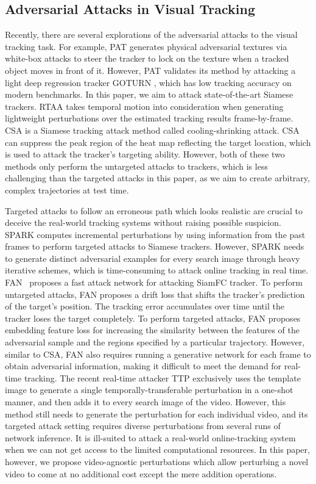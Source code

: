 \documentclass[journal]{IEEEtran}
\renewcommand{\uline}{}
\begin{document}
\subsection{Adversarial Attacks in Visual Tracking} \label{attacktracker}
Recently, there are several explorations of the adversarial attacks to the visual tracking task. For example, PAT \cite{PAT} generates physical adversarial textures via white-box attacks to steer the tracker to lock on the texture when a tracked object moves in front of it. However, PAT validates its method by attacking a light deep regression tracker GOTURN \cite{GOTURN}, which has low tracking accuracy on modern benchmarks. In this paper, we aim to attack state-of-the-art Siamese trackers. RTAA \cite{RTAA} takes temporal motion into consideration when generating lightweight perturbations over the estimated tracking results frame-by-frame. \uline{CSA \cite{CSA} is a Siamese tracking attack method called cooling-shrinking attack. CSA can suppress the peak region of the heat map reflecting the target location, which is used to attack the tracker's targeting ability. However, both of these two methods only perform} the untargeted attacks \uline{to} trackers, which is less challenging than the targeted attacks in this paper, as we aim to create arbitrary, complex trajectories at test time. 

Targeted attacks to follow an erroneous path which looks realistic are crucial to deceive the real-world tracking \uline{systems} without raising possible suspicion. SPARK \cite{SPARK} computes incremental perturbations by using information from the past frames to perform targeted attacks \uline{to} Siamese trackers. However, SPARK needs to generate distinct adversarial examples for every search image through heavy iterative schemes, which is time-consuming to attack online tracking in real time. \uline{FAN~\cite{FAN} proposes a fast attack network for attacking SiamFC tracker. To perform untargeted attacks, FAN proposes a drift loss that shifts the tracker's prediction of the target's position. The tracking error accumulates over time until the tracker loses the target completely. To perform targeted attacks, FAN proposes embedding feature loss for increasing the similarity between the features of the adversarial sample and the regions specified by a particular trajectory. However, similar to CSA, FAN also requires running a generative network for each frame to obtain adversarial information, making it difficult to meet the demand for real-time tracking.} The recent real-time attacker TTP \cite{TTP} exclusively uses the template image to generate \uline{a single} temporally-transferable perturbation in a one-shot manner, and then adds it to every search image of the video. However, this method still needs to generate \uline{the perturbation} for each individual video, and its targeted attack setting requires diverse perturbations from several runs of network inference. It is ill-suited to attack a real-world online-tracking system when we can not get access to the limited computational resources. In this paper, however, we propose video-agnostic perturbations which allow perturbing a novel video to come at no additional cost except the mere addition operations.
\end{document}
